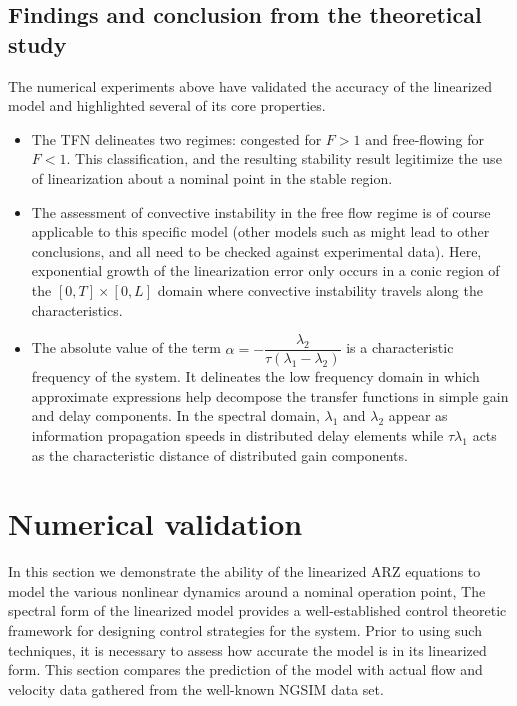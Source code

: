 \documentclass[preprint]{elsarticle}
\begin{document}
\subsection{Findings and conclusion from the theoretical study}
The numerical experiments above have validated the accuracy of the linearized model and highlighted several of its core properties.
\begin{itemize}
\item The TFN delineates two regimes: congested for $F > 1$ and free-flowing for $F < 1$. This classification, and the resulting stability result legitimize the use of linearization about a nominal point in the stable region.
\item  The assessment of convective instability in the free flow regime is of course applicable to this specific model (other models such as \cite{Jamitons-multi-valued-fund} might lead to other conclusions, and all need to be checked against experimental data). Here, exponential growth of the linearization error only occurs in a conic region of the  $\left[0,T\right] \times \left[0,L\right]$ domain where convective instability travels along the characteristics.
\item The absolute value of the term $\alpha = -\dfrac{\lambda_2}{\tau(\lambda_1 - \lambda_2)}$ is a characteristic frequency of the system. It delineates the low frequency domain in which approximate expressions help decompose the transfer functions in simple gain and delay components. In the spectral domain, $\lambda_{1}$ and $\lambda_{2}$ appear as information propagation speeds in distributed delay elements while  $\tau\lambda_{1}$ acts as the characteristic distance of distributed gain components.
\end{itemize}


\section{Numerical validation}

In this section we demonstrate the ability of the linearized ARZ equations to model the various nonlinear dynamics around a nominal operation point, The spectral form of the linearized
model provides a well-established control theoretic framework for designing control strategies for the system. Prior to using such techniques, it is necessary to assess how accurate the
model is in its linearized form. This section compares the prediction of the model with actual flow
and velocity data gathered from the well-known NGSIM data set.
\end{document}
